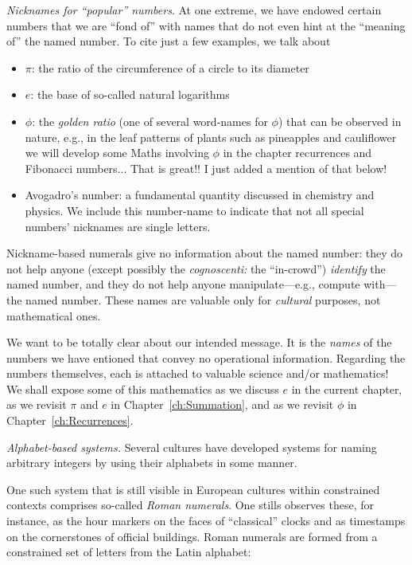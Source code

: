 \noindent
{\it Nicknames for ``popular'' numbers}.
%
At one extreme, we have endowed certain numbers that we are ``fond
of'' with names that do not even hint at the ``meaning of'' the named
number.  To cite just a few examples, we talk about
\begin{itemize}
\item
$\pi$: the ratio of the circumference of a circle to its diameter
\item
$e$: the base of so-called natural logarithms
\item
$\phi$: the {\it golden ratio} (one of several word-names for $\phi$)
  that can be observed in nature, e.g., in the leaf patterns of plants
  such as pineapples and cauliflower
  {\Denis we will develop some Maths involving $\phi$  in the chapter
    recurrences and Fibonacci numbers...}
{\Arny That is great!!  I just added a mention of that below!}
\item
Avogadro's number: a fundamental quantity discussed in chemistry and
physics.  We include this number-name to indicate that not all
special numbers' nicknames are single letters.
\end{itemize}
Nickname-based numerals give no information about the named number:
they do not help anyone (except possibly the {\it cognoscenti:} the
``in-crowd'') {\em identify} the named number, and they do not help
anyone manipulate---e.g., compute with---the named number.  These
names are valuable only for {\em cultural} purposes, not mathematical
ones.

We want to be totally clear about our intended message.  It is the
{\em names} of the numbers we have entioned that convey no operational
information.  Regarding the numbers themselves, each is attached to
valuable science and/or mathematics!  We shall expose some of this
mathematics as we discuss $e$ in the current chapter, as we revisit
$\pi$ and $e$ in Chapter~\ref{ch:Summation}, and as we revisit $\phi$
in Chapter~\ref{ch:Recurrences}.

\medskip

\noindent
{\it Alphabet-based systems.}
%
Several cultures have developed systems for naming arbitrary integers
by using their alphabets in some manner.

One such system that is still visible in European cultures within
constrained contexts comprises so-called {\it Roman numerals}.  One
stills observes these, for instance, as the hour markers on the faces
of ``classical'' clocks and as timestamps on the cornerstones of
official buildings.  Roman numerals are formed from a constrained set
of letters from the Latin alphabet:

